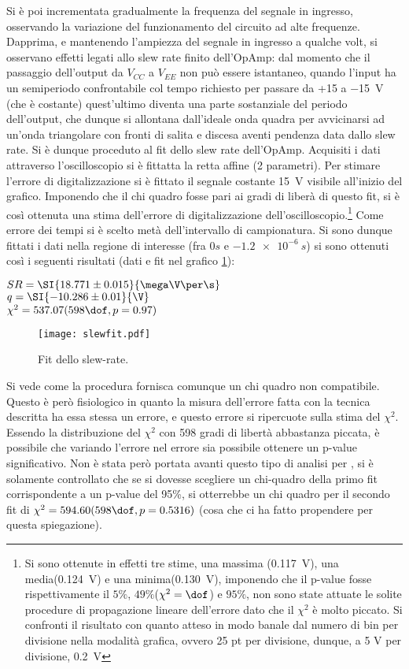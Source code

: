 Si è poi incrementata gradualmente la frequenza del segnale in ingresso, osservando la variazione del funzionamento del circuito ad alte frequenze.
Dapprima, e mantenendo l'ampiezza del segnale in ingresso a qualche volt, si osservano effetti legati allo slew rate finito dell'OpAmp: dal momento che il passaggio dell'output da $V_{CC}$ a $V_{EE}$ non può essere istantaneo, quando l'input ha un semiperiodo confrontabile col tempo richiesto per passare da +15 a \SI{-15}{\V} (che è costante) quest'ultimo diventa una parte sostanziale del periodo dell'output, che dunque si allontana dall'ideale onda quadra per avvicinarsi ad un'onda triangolare con fronti di salita e discesa aventi pendenza data dallo slew rate.
Si è dunque proceduto al fit dello slew rate dell'OpAmp. Acquisiti i dati attraverso l'oscilloscopio si è fittatta la retta affine (2 parametri). Per stimare l'errore di digitalizzazione si è fittato il segnale costante \SI{15}{\V} visibile all'inizio del grafico. Imponendo che il chi quadro fosse pari ai gradi di liberà di questo fit, si è così ottenuta una stima dell'errore di digitalizzazione dell'oscilloscopio.\footnote{Si sono ottenute in effetti tre stime, una massima (\SI{0.117}{V}), una media(\SI{0.124}{V}) e una minima(\SI{0.130}{V}), imponendo che il p-value fosse rispettivamente il $5\%$, $49\%$($\chi^2=\dof$) e $95\%$, non sono state attuate le solite procedure di propagazione lineare dell'errore dato che il $\chi^2$ è molto piccato. Si confronti il risultato con quanto atteso in modo banale dal numero di bin per divisione nella modalità grafica, ovvero 25 pt per divisione, dunque, a 5 V per divisione,  \SI{0.2}{V}} Come errore dei tempi si è scelto metà dell'intervallo di campionatura. Si sono dunque fittati i dati nella regione di interesse (fra $0 s$ e $\SI{-1.2e-6}{s}$) si sono ottenuti così i seguenti risultati	(dati e fit nel grafico \ref{f:SLW}):

$SR = \SI{18.771 \pm 0.015}{\mega\V\per\s}$\\
$q = \SI{-10.286 \pm 0.01}{\V}$\\
$\chi^2 = 537.07 (598 \dof, p = 0.97)$

\begin{figure}[h]
	\centering
	\texttt{[image: slewfit.pdf]}
	\caption{Fit dello slew-rate.}
	\label{f:SLW}
\end{figure}
Si vede come la procedura fornisca comunque un chi quadro non compatibile. Questo è però fisiologico in quanto la misura dell'errore fatta con la tecnica descritta ha essa stessa un errore, e questo errore si ripercuote sulla stima del $\chi^2$. Essendo la distribuzione del $\chi^2$ con 598 gradi di libertà abbastanza piccata, è possibile che variando l'errore nel errore sia possibile ottenere un p-value significativo. Non è stata però portata avanti questo tipo di analisi per \sbatta, si è solamente controllato che se si dovesse scegliere un chi-quadro della primo fit corrispondente a un p-value del 95\%, si otterrebbe un chi quadro per il secondo fit di $\chi^2 = 594.60 (598 \dof, p = 0.5316)$ (cosa che ci ha fatto propendere per questa spiegazione).



